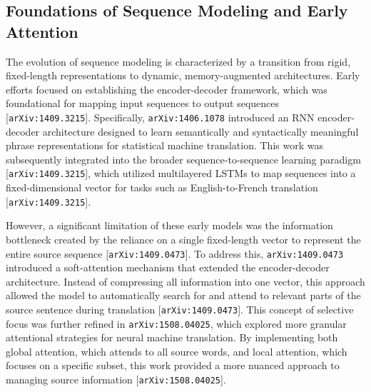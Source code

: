 \documentclass[11pt]{article}
\begin{document}
\subsection{Foundations of Sequence Modeling and Early Attention}

The evolution of sequence modeling is characterized by a transition from rigid, fixed-length representations to dynamic, memory-augmented architectures. Early efforts focused on establishing the encoder-decoder framework, which was foundational for mapping input sequences to output sequences [\texttt{arXiv:1409.3215}]. Specifically, \texttt{arXiv:1406.1078} introduced an RNN encoder-decoder architecture designed to learn semantically and syntactically meaningful phrase representations for statistical machine translation. This work was subsequently integrated into the broader sequence-to-sequence learning paradigm [\texttt{arXiv:1409.3215}], which utilized multilayered LSTMs to map sequences into a fixed-dimensional vector for tasks such as English-to-French translation [\texttt{arXiv:1409.3215}].

However, a significant limitation of these early models was the information bottleneck created by the reliance on a single fixed-length vector to represent the entire source sequence [\texttt{arXiv:1409.0473}]. To address this, \texttt{arXiv:1409.0473} introduced a soft-attention mechanism that extended the encoder-decoder architecture. Instead of compressing all information into one vector, this approach allowed the model to automatically search for and attend to relevant parts of the source sentence during translation [\texttt{arXiv:1409.0473}]. This concept of selective focus was further refined in \texttt{arXiv:1508.04025}, which explored more granular attentional strategies for neural machine translation. By implementing both global attention, which attends to all source words, and local attention, which focuses on a specific subset, this work provided a more nuanced approach to managing source information [\texttt{arXiv:1508.04025}].
\end{document}
